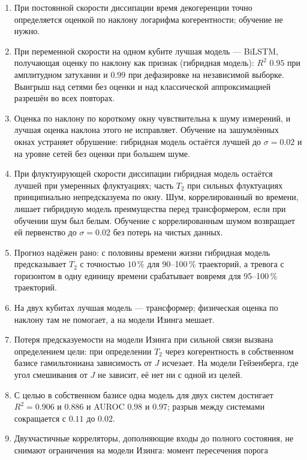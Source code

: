 \documentclass[12pt,a4paper]{report}
\numberwithin{equation}{chapter}
\begin{document}
\begin{enumerate}
\item При постоянной скорости диссипации время декогеренции точно
      определяется оценкой по наклону логарифма когерентности; обучение не
      нужно.
\item При переменной скорости на одном кубите лучшая модель --- BiLSTM,
      получающая оценку по наклону как признак (гибридная модель): $R^2$
      $0.95$ при амплитудном затухании и $0.99$ при дефазировке на
      независимой выборке. Выигрыш над сетями без оценки и над классической
      аппроксимацией разрешён во всех повторах.
\item Оценка по наклону по короткому окну чувствительна к шуму измерений,
      и лучшая оценка наклона этого не исправляет. Обучение на зашумлённых
      окнах устраняет обрушение: гибридная модель остаётся лучшей до
      $\sigma=0.02$ и на уровне сетей без оценки при большем шуме.
\item При флуктуирующей скорости диссипации гибридная модель остаётся
      лучшей при умеренных флуктуациях; часть $T_2$ при сильных
      флуктуациях принципиально непредсказуема по окну. Шум,
      коррелированный во времени, лишает гибридную модель преимущества
      перед трансформером, если при обучении шум был белым. Обучение с
      коррелированным шумом возвращает ей первенство до $\sigma=0.02$ без
      потерь на чистых данных.
\item Прогноз надёжен рано: с половины времени жизни гибридная модель
      предсказывает $T_2$ с точностью $10\,\%$ для 90--100\,\% траекторий, а
      тревога с горизонтом в одну единицу времени срабатывает вовремя для
      95--100\,\% траекторий.
\item На двух кубитах лучшая модель --- трансформер; физическая оценка
      по наклону там не помогает, а на модели Изинга мешает.
\item Потеря предсказуемости на модели Изинга при сильной связи вызвана
      определением цели: при определении $T_2$ через когерентность в
      собственном базисе гамильтониана зависимость от $J$ исчезает. На
      модели Гейзенберга, где угол смешивания от $J$ не зависит, её нет ни с
      одной из целей.
\item С целью в собственном базисе одна модель для двух систем достигает
      $R^2=0.906$ и $0.886$ и AUROC $0.98$ и $0.97$; разрыв между системами
      сокращается с $0.11$ до $0.02$.
\item Двухчастичные корреляторы, дополняющие входы до полного состояния,
      не снимают ограничения на модели Изинга: момент пересечения порога

\end{enumerate}
\end{document}
